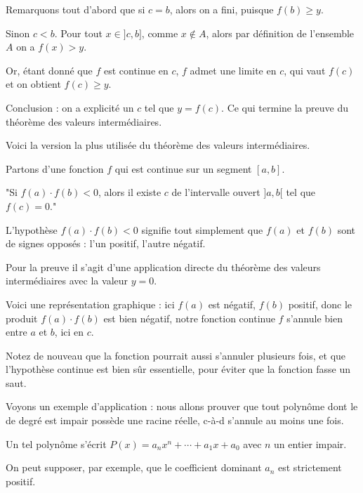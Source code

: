 Remarquons tout d'abord que si $c=b$, 
alors on a fini, puisque $f(b)\geq y$. 

\change

Sinon $c<b$. Pour tout $x\in]c,b]$, comme $x\notin A$, alors par définition de l'ensemble $A$
on a $f(x)>y$. 

\change

Or, étant donné que $f$ est continue en $c$, $f$ admet une limite 
en $c$, qui vaut $f(c)$ et on obtient $f(c)\geq y$.


Conclusion : on a explicité un $c$ tel que $y=f(c)$.
Ce qui termine la preuve du théorème des valeurs intermédiaires.


\diapo

Voici la version la plus utilisée du théorème des valeurs intermédiaires.

\change

Partons d'une fonction $f$ qui est continue sur un segment $[a,b]$.

"Si $f(a)\cdot f(b)<0$, alors il existe $c$ de l'intervalle ouvert $]a,b[$ tel que $f(c)=0$."


L'hypothèse $f(a)\cdot f(b)<0$ signifie tout simplement que $f(a)$ et $f(b)$ 
sont de signes opposés : l'un positif, l'autre négatif.


\change

Pour la preuve il s'agit d'une application directe du théorème des valeurs intermédiaires avec la valeur $y=0$.

\change

Voici une représentation graphique : ici $f(a)$ est négatif, $f(b)$ positif, donc le produit
$f(a)\cdot f(b)$ est bien négatif, notre fonction continue $f$ s'annule bien entre $a$ et $b$, 
ici en $c$.

Notez de nouveau que la fonction pourrait aussi s'annuler plusieurs fois,
et que l'hypothèse continue est bien sûr essentielle, pour éviter que la fonction fasse un saut.


\diapo

Voyons un exemple d'application : nous allons prouver que
tout polynôme dont le de degré est impair possède une racine réelle,
c-à-d s'annule au moins une fois.


\change

Un tel polynôme s'écrit $P(x)=a_nx^n+\cdots+a_1x+a_0$ avec $n$ un entier impair. 

On peut supposer, par exemple, que le coefficient dominant $a_n$ est strictement positif.

